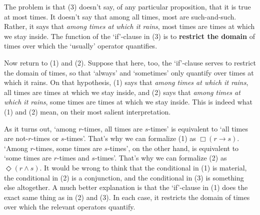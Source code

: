 The problem is that (3) doesn't say, of any particular proposition, that it is
true at most times. It doesn't say that among all times, most are such-and-such.
Rather, it says that \emph{among times at which it rains}, most times are times
at which we stay inside. The function of the `if'-clause in (3) is to
\textbf{restrict the domain} of times over which the `usually' operator
quantifies.



Now return to (1) and (2). Suppose that here, too, the `if'-clause serves to
restrict the domain of times, so that `always' and `sometimes' only quantify
over times at which it rains. On that hypothesis, (1) says that \emph{among
  times at which it rains}, all times are times at which we stay inside, and (2)
says that \emph{among times at which it rains}, some times are times at which we
stay inside. This is indeed what (1) and (2) mean, on their most salient
interpretation.

As it turns out, `among $r$-times, all times are $s$-times' is equivalent to `all
times are not-$r$-times or $s$-times'. That's why we can formalize (1) as
$\Box(r \to s)$. `Among $r$-times, some times are $s$-times', on the other hand,
is equivalent to `some times are $r$-times and $s$-times'. That's why we can
formalize (2) as $\Diamond(r \land s)$. It would be wrong to think that the
conditional in (1) is material, the conditional in (2) is a conjunction, and the
conditional in (3) is something else altogether. A much better explanation is
that the `if'-clause in (1) does the exact same thing as in (2) and (3). In each
case, it restricts the domain of times over which the relevant operators
quantify.

